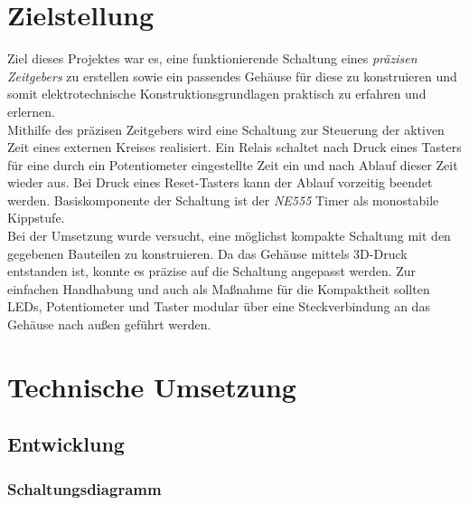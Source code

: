 \documentclass[a4paper, 12pt]{article}
\begin{document}
  
  \tableofcontents{}
  \listoffigures

  \clearpage
  \setcounter{page}{1}

\section{Zielstellung}

  Ziel dieses Projektes war es, eine funktionierende Schaltung eines \emph{präzisen Zeitgebers} zu erstellen sowie ein passendes Gehäuse für diese zu konstruieren und somit elektrotechnische Konstruktionsgrundlagen praktisch zu erfahren und erlernen.\\

  Mithilfe des präzisen Zeitgebers wird eine Schaltung zur Steuerung der aktiven Zeit eines externen Kreises realisiert. Ein Relais schaltet nach Druck eines Tasters für eine durch ein Potentiometer eingestellte Zeit ein und nach Ablauf dieser Zeit wieder aus. Bei Druck eines Reset-Tasters kann der Ablauf vorzeitig beendet werden. Basiskomponente der Schaltung ist der \emph{\textsc{NE555}} Timer als monostabile Kippstufe.\\

  Bei der Umsetzung wurde versucht, eine möglichst kompakte Schaltung mit den gegebenen Bauteilen zu konstruieren.
  Da das Gehäuse mittels 3D-Druck entstanden ist, konnte es präzise auf die Schaltung angepasst werden. Zur einfachen Handhabung und auch als Maßnahme für die Kompaktheit sollten LEDs, Potentiometer und Taster modular über eine Steckverbindung an das Gehäuse nach außen geführt werden.

\section{Technische Umsetzung}
  \subsection{Entwicklung}

    \subsubsection{Schaltungsdiagramm}
\end{document}
